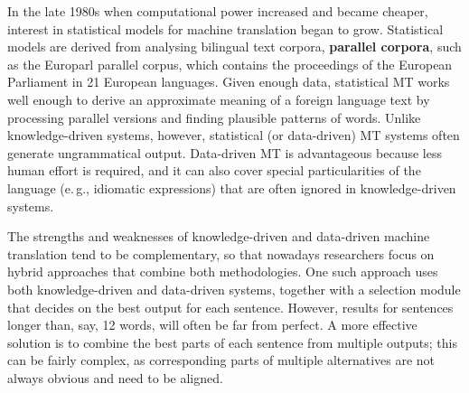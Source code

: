 \begin{multicols}{2}
In the late 1980s when computational power increased and became cheaper, interest in statistical models for machine translation began to grow. Statistical models are derived from analysing bilingual text corpora, \textbf{parallel corpora}, such as the Europarl parallel corpus, which contains the proceedings of the European Parliament in 21 European languages. Given enough data, statistical MT works well enough to derive an approximate meaning of a foreign language text by processing parallel versions and finding plausible patterns of words. Unlike knowledge-driven systems, however, statistical (or data-driven) MT systems often generate ungrammatical output. Data-driven MT is advantageous because less human effort is required, and it can also cover special particularities of the language (e.\,g., idiomatic expressions) that are often ignored in knowledge-driven systems. 


The strengths and weaknesses of knowledge-driven and data-driven machine translation tend to be complementary, so that nowadays researchers focus on hybrid approaches that combine both methodologies. One such approach uses both knowledge-driven and data-driven systems, together with a selection module that decides on the best output for each sentence. However, results for sentences longer than, say, 12 words, will often be far from perfect. A more effective solution is to combine the best parts of each sentence from multiple outputs; this can be fairly complex, as corresponding parts of multiple alternatives are not always obvious and need to be aligned. 


\end{multicols}
